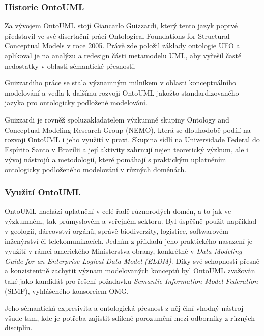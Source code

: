 \subsubsection{Historie OntoUML}
\label{sec:historie-ontouml}
Za vývojem OntoUML stojí Giancarlo Guizzardi, který tento jazyk poprvé představil ve své disertační práci Ontological Foundations for Structural Conceptual Models v roce 2005. Právě zde položil základy ontologie UFO a aplikoval je na analýzu a redesign části metamodelu UML, aby vyřešil časté nedostatky v oblasti sémantické přesnosti. \cite{Guizzardi2005}

Guizzardiho práce se stala významným milníkem v oblasti konceptuálního modelování a vedla k dalšímu rozvoji OntoUML jakožto standardizovaného jazyka pro ontologicky podložené modelování. \cite{Guizzardi2015}

Guizzardi je rovněž spoluzakladatelem výzkumné skupiny Ontology and Conceptual Modeling Research Group (NEMO), která se dlouhodobě podílí na rozvoji OntoUML i jeho využití v praxi. Skupina sídlí na Universidade Federal do Espírito Santo v Brazílii a její aktivity zahrnují nejen teoretický výzkum, ale i vývoj nástrojů a metodologií, které pomáhají s praktickým uplatněním ontologicky podloženého modelování v různých doménách. \cite{NEMO}


\subsubsection{Využití OntoUML}
\label{sec:využití-ontouml}
OntoUML nachází uplatnění v celé řadě různorodých domén, a to jak ve výzkumném, tak průmyslovém a veřejném sektoru. Byl úspěšně použit například v geologii, dárcovství orgánů, správě biodiverzity, logistice, softwarovém inženýrství či telekomunikacích. \cite{Sales2023,Ruy2017} Jedním z příkladů jeho praktického nasazení je využití v rámci amerického Ministerstva obrany, konkrétně v \textit{Data Modeling Guide for an Enterprise Logical Data Model (ELDM)}. Díky své schopnosti přesně a konzistentně zachytit význam modelovaných konceptů byl OntoUML zvažován také jako kandidát pro řešení požadavku \textit{Semantic Information Model Federation} (SIMF), vyhlášeného konsorciem OMG. \cite{Ruy2017}

Jeho sémantická expresivita a ontologická přesnost z něj činí vhodný nástroj všude tam, kde je potřeba zajistit sdílené porozumění mezi odborníky z různých disciplín. \cite{Sales2023,Guizzardi2013}

